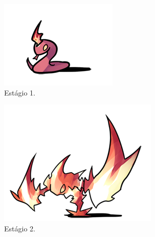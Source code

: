 \documentclass[
	12pt,				%
	openright,			%
	twoside,			%
	a4paper,			%
	english,			%
	french,				%
	spanish,			%
	brazil				%
	]{abntex2}
\begin{document}
\begin{figure}[h!]
  \centering
  \begin{subfigure}[b]{0.2\linewidth}
    \includegraphics[width=\linewidth]{stage1.png}
     \caption{Estágio 1.}
  \end{subfigure}
  \begin{subfigure}[b]{0.3\linewidth}
    \includegraphics[width=\linewidth]{stage2.png}
    \caption{Estágio 2.}
  \end{subfigure}
  \begin{subfigure}[b]{0.45\linewidth}

\end{subfigure}
\end{figure}
\end{document}
